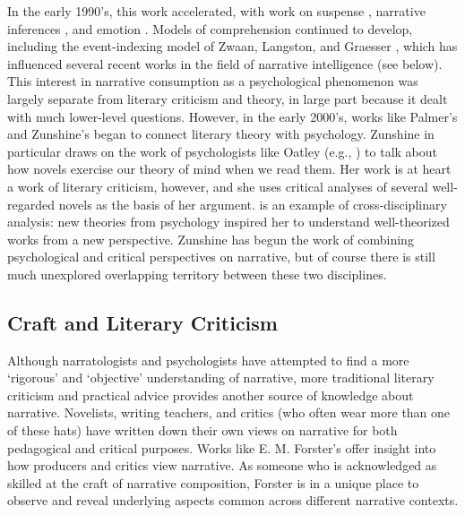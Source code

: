 In the early 1990's, this work accelerated, with work on suspense \citep{Gerrig1994}, narrative inferences \citep{Graesser1994}, and emotion \citep{Oatley1995}.
%
Models of comprehension continued to develop, including the event-indexing model of Zwaan, Langston, and Graesser \citep{Zwaan1995}, which has influenced several recent works in the field of narrative intelligence (see below).
%
This interest in narrative consumption as a psychological phenomenon was largely separate from literary criticism and theory, in large part because it dealt with much lower-level questions.
%
However, in the early 2000's, works like Palmer's  \citep{Palmer2004} and Zunshine's  \citep{Zunshine2006} began to connect literary theory with psychology.
%
Zunshine in particular draws on the work of psychologists like Oatley (e.g., \citep{Oatley1999}) to talk about how novels exercise our theory of mind when we read them.
%
Her work is at heart a work of literary criticism, however, and she uses critical analyses of several well-regarded novels as the basis of her argument.
%
 is an example of cross-disciplinary analysis: new theories from psychology inspired her to understand well-theorized works from a new perspective.
%
Zunshine has begun the work of combining psychological and critical perspectives on narrative, but of course there is still much unexplored overlapping territory between these two disciplines.


\subsection{Craft and Literary Criticism}

Although narratologists and psychologists have attempted to find a more `rigorous' and `objective' understanding of narrative, more traditional literary criticism and practical advice provides another source of knowledge about narrative.
%
Novelists, writing teachers, and critics (who often wear more than one of these hats) have written down their own views on narrative for both pedagogical and critical purposes.
%
Works like E. M. Forster's  \citep{Forster1927} offer insight into how producers and critics view narrative.
%
As someone who is acknowledged as skilled at the craft of narrative composition, Forster is in a unique place to observe and reveal underlying aspects common across different narrative contexts.


